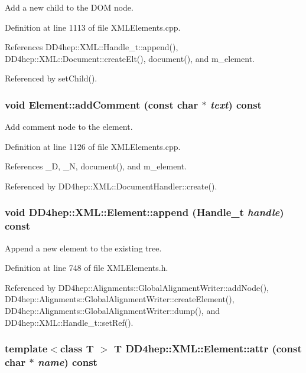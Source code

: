 Add a new child to the DOM node. 

Definition at line 1113 of file XMLElements.cpp.

References DD4hep::XML::Handle\_\-t::append(), DD4hep::XML::Document::createElt(), document(), and m\_\-element.

Referenced by setChild().\hypertarget{class_d_d4hep_1_1_x_m_l_1_1_element_a6503c7da3a4cb6f04943175f85f1ac6f}{
\subsubsection[{addComment}]{\setlength{\rightskip}{0pt plus 5cm}void Element::addComment (const char $\ast$ {\em text}) const}}
\label{class_d_d4hep_1_1_x_m_l_1_1_element_a6503c7da3a4cb6f04943175f85f1ac6f}


Add comment node to the element. 

Definition at line 1126 of file XMLElements.cpp.

References \_\-D, \_\-N, document(), and m\_\-element.

Referenced by DD4hep::XML::DocumentHandler::create().\hypertarget{class_d_d4hep_1_1_x_m_l_1_1_element_ac6be868dcd489b0756e3c70511d3605f}{
\subsubsection[{append}]{\setlength{\rightskip}{0pt plus 5cm}void DD4hep::XML::Element::append ({\bf Handle\_\-t} {\em handle}) const}}
\label{class_d_d4hep_1_1_x_m_l_1_1_element_ac6be868dcd489b0756e3c70511d3605f}


Append a new element to the existing tree. 

Definition at line 748 of file XMLElements.h.

Referenced by DD4hep::Alignments::GlobalAlignmentWriter::addNode(), DD4hep::Alignments::GlobalAlignmentWriter::createElement(), DD4hep::Alignments::GlobalAlignmentWriter::dump(), and DD4hep::XML::Handle\_\-t::setRef().\hypertarget{class_d_d4hep_1_1_x_m_l_1_1_element_a11a9445e2fc00281b5b008774ae60e91}{
\subsubsection[{attr}]{\setlength{\rightskip}{0pt plus 5cm}template$<$class T $>$ {\bf T} DD4hep::XML::Element::attr (const char $\ast$ {\em name}) const}}
\label{class_d_d4hep_1_1_x_m_l_1_1_element_a11a9445e2fc00281b5b008774ae60e91}


